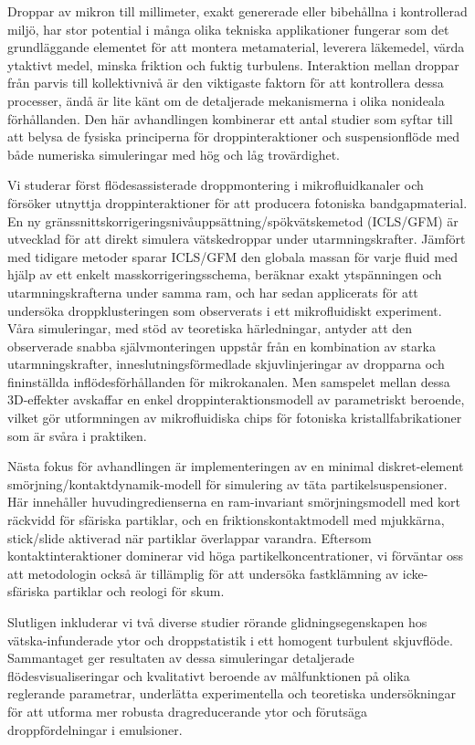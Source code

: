 \begin{abstrakt}
Droppar av mikron till millimeter, exakt genererade eller bibehållna i kontrollerad miljö, har stor potential i många olika tekniska applikationer
fungerar som det grundläggande elementet för att montera metamaterial, leverera läkemedel, värda ytaktivt medel, minska friktion och fuktig turbulens.
Interaktion mellan droppar från parvis till kollektivnivå är den viktigaste faktorn för att kontrollera dessa processer,
ändå är lite känt om de detaljerade mekanismerna i olika nonideala förhållanden.
Den här avhandlingen kombinerar ett antal studier som syftar till att belysa de fysiska principerna för droppinteraktioner och suspensionflöde
med både numeriska simuleringar med hög och låg trovärdighet.

Vi studerar först flödesassisterade droppmontering i mikrofluidkanaler och försöker utnyttja droppinteraktioner för att producera fotoniska bandgapmaterial.
En ny gränssnittskorrigeringsnivåuppsättning/spökvätskemetod (ICLS/GFM) är utvecklad för att direkt simulera vätskedroppar under utarmningskrafter.
Jämfört med tidigare metoder sparar ICLS/GFM den globala massan för varje fluid med hjälp av ett enkelt masskorrigeringsschema,
beräknar exakt ytspänningen och utarmningskrafterna under samma ram,
och har sedan applicerats för att undersöka droppklusteringen som observerats i ett mikrofluidiskt experiment.
Våra simuleringar, med stöd av teoretiska härledningar, antyder att den observerade snabba självmonteringen uppstår från en kombination av
starka utarmningskrafter, inneslutningsförmedlade skjuvlinjeringar av dropparna och fininställda inflödesförhållanden för mikrokanalen.
Men samspelet mellan dessa 3D-effekter avskaffar en enkel droppinteraktionsmodell av parametriskt beroende,
vilket gör utformningen av mikrofluidiska chips för fotoniska kristallfabrikationer som är svåra i praktiken.

Nästa fokus för avhandlingen är implementeringen av en minimal diskret-element smörjning/kontaktdynamik-modell för simulering av täta partikelsuspensioner.
Här innehåller huvudingredienserna en ram-invariant smörjningsmodell med kort räckvidd för sfäriska partiklar,
och en friktionskontaktmodell med mjukkärna, stick/slide aktiverad när partiklar överlappar varandra.
Eftersom kontaktinteraktioner dominerar vid höga partikelkoncentrationer,
vi förväntar oss att metodologin också är tillämplig för att undersöka fastklämning av icke-sfäriska partiklar och reologi för skum.

Slutligen inkluderar vi två diverse studier rörande
glidningsegenskapen hos vätska-infunderade ytor och droppstatistik i ett homogent turbulent skjuvflöde.
Sammantaget ger resultaten av dessa simuleringar detaljerade flödesvisualiseringar och kvalitativt beroende av målfunktionen på olika reglerande parametrar,
underlätta experimentella och teoretiska undersökningar för att utforma mer robusta dragreducerande ytor och förutsäga droppfördelningar i emulsioner.
%
%
\end{abstrakt}


